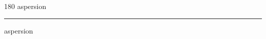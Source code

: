 
\begin{frame}
\begin{center}
\begin{turn}{180}
{\fontsize{2.5cm}{1em}\selectfont aspersion}
\end{turn}
\vspace{1em}\par  
\hrule
\vspace{1em}\par  
{\fontsize{2.5cm}{1em}\selectfont aspersion}
\end{center}
\end{frame}
